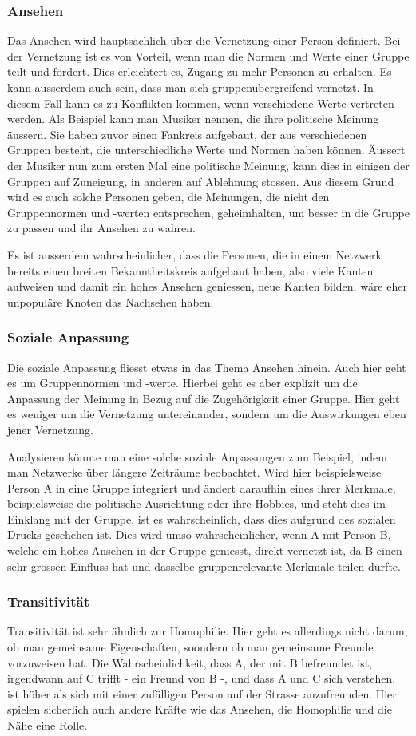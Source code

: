 \subsubsection{Ansehen}
Das Ansehen wird hauptsächlich über die Vernetzung einer Person definiert. Bei der Vernetzung ist es von Vorteil, wenn
man die Normen und Werte einer Gruppe teilt und fördert. Dies erleichtert es, Zugang zu mehr Personen zu erhalten. Es
kann ausserdem auch sein, dass man sich gruppenübergreifend vernetzt. In diesem Fall kann es zu Konflikten kommen, wenn
verschiedene Werte vertreten werden. Als Beispiel kann man Musiker nennen, die ihre politische Meinung äussern. Sie
haben zuvor einen Fankreis aufgebaut, der aus verschiedenen Gruppen besteht, die unterschiedliche Werte und Normen
haben können. Äussert der Musiker nun zum ersten Mal eine politische Meinung, kann dies in einigen der Gruppen auf
Zuneigung, in anderen auf Ablehnung stossen. Aus diesem Grund wird es auch solche Personen geben, die Meinungen, die
nicht den Gruppennormen und -werten entsprechen, geheimhalten, um besser in die Gruppe zu passen und ihr Ansehen zu wahren.

Es ist ausserdem wahrscheinlicher, dass die Personen, die in einem Netzwerk bereits einen breiten Bekanntheitskreis
aufgebaut haben, also viele Kanten aufweisen und damit ein hohes Ansehen geniessen, neue Kanten bilden, wäre eher
unpopuläre Knoten das Nachsehen haben.

\subsubsection{Soziale Anpassung}
Die soziale Anpassung fliesst etwas in das Thema Ansehen hinein. Auch hier geht es um Gruppennormen und -werte. Hierbei
geht es aber explizit um die Anpassung der Meinung in Bezug auf die Zugehörigkeit einer Gruppe. Hier geht es weniger
um die Vernetzung untereinander, sondern um die Auswirkungen eben jener Vernetzung.

Analysieren könnte man eine solche soziale Anpassungen zum Beispiel, indem man Netzwerke über längere Zeiträume
beobachtet. Wird hier beispielsweise Person A in eine Gruppe integriert und ändert daraufhin eines ihrer Merkmale,
beispielsweise die politische Ausrichtung oder ihre Hobbies, und steht dies im Einklang mit der Gruppe, ist es
wahrscheinlich, dass dies aufgrund des sozialen Drucks geschehen ist. Dies wird umso wahrscheinlicher, wenn A mit Person B,
welche ein hohes Ansehen in der Gruppe geniesst, direkt vernetzt ist, da B einen sehr grossen Einfluss hat und dasselbe
gruppenrelevante Merkmale teilen dürfte.

\subsubsection{Transitivität}
Transitivität ist sehr ähnlich zur Homophilie. Hier geht es allerdings nicht darum, ob man gemeinsame Eigenschaften,
soondern ob man gemeinsame Freunde vorzuweisen hat. Die Wahrscheinlichkeit, dass A, der mit B befreundet ist, irgendwann
auf C trifft - ein Freund von B -, und dass A und C sich verstehen, ist höher als sich mit einer zufälligen Person auf
der Strasse anzufreunden. Hier spielen sicherlich auch andere Kräfte wie das Ansehen, die Homophilie und die Nähe eine Rolle.
